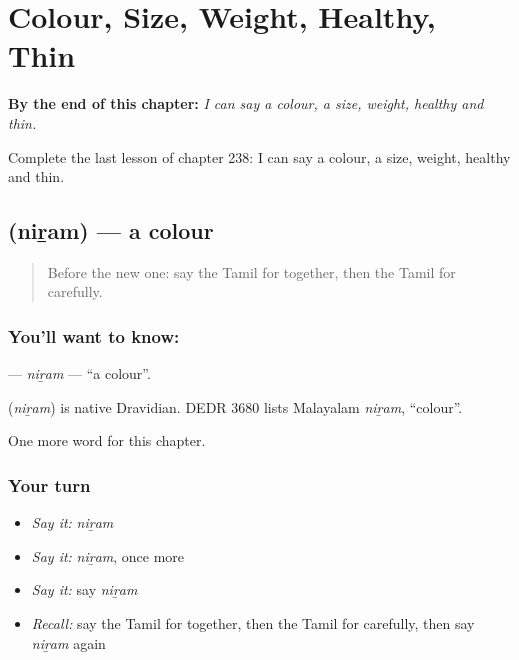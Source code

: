 
\chapter{Colour, Size, Weight, Healthy, Thin}
\label{ch:ta-colour-size-weight-healthy-thin}

\begin{chapteropening}
\textbf{By the end of this chapter:} \emph{I can say a colour, a size, weight, healthy and thin.}

Complete the last lesson of chapter 238: I can say a colour, a size, weight, healthy and thin.
\end{chapteropening}

\section[\texorpdfstring{\ta{நிறம்} (niṟam)}{நிறம் (niṟam)}]{ (niṟam) — a colour}

\label{lesson:TA-C238-niram}



\begin{quote}
Before the new one: say the Tamil for together, then the Tamil for carefully.
\end{quote}

\subsection*{You'll want to know: }
\textbf{} — \emph{niṟam} — \textquotedblleft{}a colour\textquotedblright{}.

\begin{cousinweb}
\textbf{} (\emph{niṟam}) is native Dravidian. DEDR 3680 lists Malayalam \emph{niṟam}, \textquotedblleft{}colour\textquotedblright{}.
\end{cousinweb}

\begin{grammarlens}[title={What you've built}]
One more word for this chapter.
\end{grammarlens}

\subsection*{Your turn}
\begin{itemize}
\raggedright
  \item \emph{Say it:} \emph{niṟam}
  \item \emph{Say it:} \emph{niṟam}, once more
  \item \emph{Say it:} say \emph{niṟam}
  \item \emph{Recall:} say the Tamil for together, then the Tamil for carefully, then say \emph{niṟam} again
\end{itemize}

